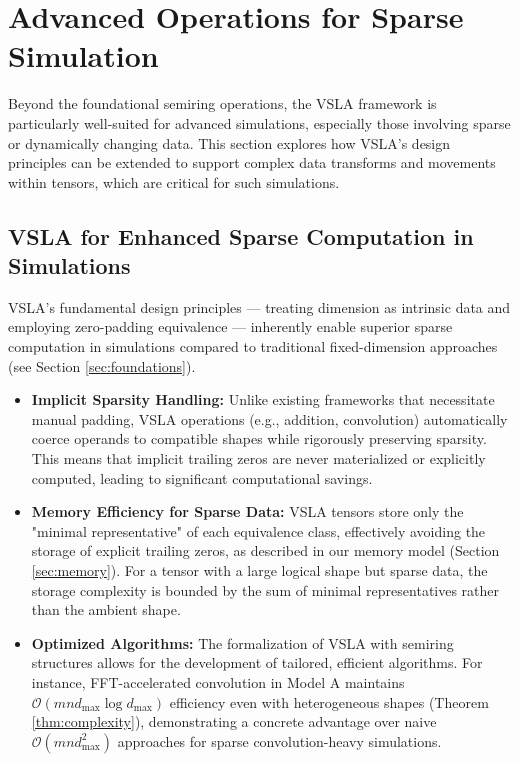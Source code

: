 \section{Advanced Operations for Sparse Simulation}
\label{sec:advanced_ops}

Beyond the foundational semiring operations, the VSLA framework is particularly well-suited for advanced simulations, especially those involving sparse or dynamically changing data. This section explores how VSLA's design principles can be extended to support complex data transforms and movements within tensors, which are critical for such simulations.

\subsection{VSLA for Enhanced Sparse Computation in Simulations}

VSLA's fundamental design principles — treating dimension as intrinsic data and employing zero-padding equivalence — inherently enable superior sparse computation in simulations compared to traditional fixed-dimension approaches (see Section \ref{sec:foundations}).

\begin{itemize}
    \item \textbf{Implicit Sparsity Handling:} Unlike existing frameworks that necessitate manual padding, VSLA operations (e.g., addition, convolution) automatically coerce operands to compatible shapes while rigorously preserving sparsity. This means that implicit trailing zeros are never materialized or explicitly computed, leading to significant computational savings.
    \item \textbf{Memory Efficiency for Sparse Data:} VSLA tensors store only the "minimal representative" of each equivalence class, effectively avoiding the storage of explicit trailing zeros, as described in our memory model (Section \ref{sec:memory}). For a tensor with a large logical shape but sparse data, the storage complexity is bounded by the sum of minimal representatives rather than the ambient shape.
    \item \textbf{Optimized Algorithms:} The formalization of VSLA with semiring structures allows for the development of tailored, efficient algorithms. For instance, FFT-accelerated convolution in Model A maintains $\mbox{$\mathcal{O}(mnd_{\max}\log d_{\max})$}$ efficiency even with heterogeneous shapes (Theorem \ref{thm:complexity}), demonstrating a concrete advantage over naive $\mbox{$\mathcal{O}(mnd_{\max}^{2})$}$ approaches for sparse convolution-heavy simulations.
\end{itemize}

